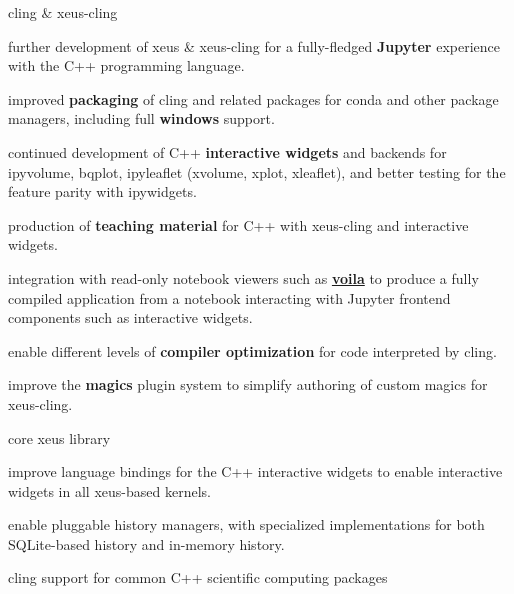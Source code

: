 \begin{task}[title=Interactive C++ in Jupyter with XEUS,
  id=xeus-cpp,
  lead=QS,
  PM=12,
  wphases={0-48},
  partners={QS,UPSUD}
]

\begin{compactenum}
\item
  cling \& xeus-cling

  \begin{compactenum}
  \item
    further development of xeus \& xeus-cling for a fully-fledged
    \textbf{Jupyter} experience with the C++ programming language.
  \item
    improved \textbf{packaging} of cling and related packages for conda
    and other package managers, including full \textbf{windows} support.
  \item
    continued development of C++ \textbf{interactive widgets} and
    backends for ipyvolume, bqplot, ipyleaflet (xvolume, xplot,
    xleaflet), and better testing for the feature parity with
    ipywidgets.
  \item
    production of \textbf{teaching material} for C++ with xeus-cling and
    interactive widgets.
  \item
    integration with read-only notebook viewers such as
    \href{https://github.com/QuantStack/voila}{\textbf{voila}} to
    produce a fully compiled application from a notebook interacting with
    Jupyter frontend components such as interactive widgets.
  \item
    enable different levels of \textbf{compiler optimization} for code
    interpreted by cling.
  \item
    improve the \textbf{magics} plugin system to simplify authoring of
    custom magics for xeus-cling.
  \end{compactenum}
\item
  core xeus library

  \begin{compactenum}
  \item
    improve language bindings for the C++ interactive widgets to enable
    interactive widgets in all xeus-based kernels.
  \item
    enable pluggable history managers, with specialized implementations
    for both SQLite-based history and in-memory history.
  \end{compactenum}
\item
  cling support for common C++ scientific computing packages


\end{compactenum}
\end{task}
